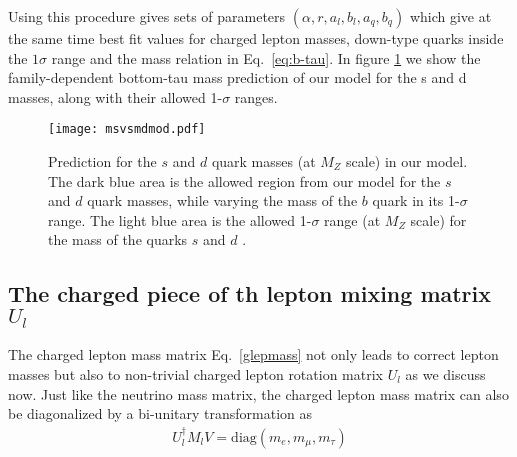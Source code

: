 \documentclass[english,10pt,aps,prd,a4paper,preprintnumbers,floatfix,nofootinbib,showpacs,superscriptaddress]{revtex4-1}
\begin{document}
  Using this procedure gives sets of parameters
  $(\alpha, r, a_l, b_l, a_q, b_q)$ which give at the same time best
  fit values for charged lepton masses, down-type quarks inside the
  $1\sigma$ range and the mass relation in Eq.~\ref{eq:b-tau}.  In
  figure \ref{fig:msvsmd} we show the family-dependent bottom-tau mass
  prediction of our model for the s and d masses, along with their
  allowed 1-$\sigma$ ranges.

  \begin{figure}[!h]
 \centering
  \texttt{[image: msvsmdmod.pdf]}
  \caption{Prediction for the $s$ and $d$ quark masses (at $M_Z$
    scale) in our model. The dark blue area is the allowed region from
    our model for the $s$ and $d$ quark masses, while varying the mass
    of the $b$ quark in its 1-$\sigma$ range. The light blue area is
    the allowed 1-$\sigma$ range (at $M_Z$ scale) for the mass of the
    quarks $s$ and $d$ \cite{Xing:2011aa}.}
  \label{fig:msvsmd}
  \end{figure}


\subsection{The charged piece of th lepton mixing matrix $U_l$ }
\label{cul}

The charged lepton mass matrix Eq.~\ref{glepmass} not only leads to
correct lepton masses but also to non-trivial charged lepton rotation
matrix $U_l$ as we discuss now. Just like the neutrino mass matrix,
the charged lepton mass matrix can also be diagonalized by a
bi-unitary transformation as
%
%
\begin{eqnarray}
U_l^\dagger M_l V =\mathrm{diag}(m_e, m_\mu, m_\tau) 
\end{eqnarray}
\end{document}
